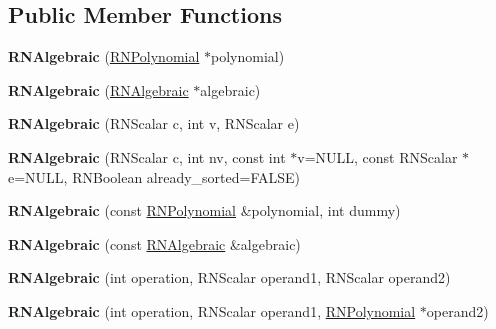 \subsection*{Public Member Functions}
\begin{DoxyCompactItemize}
\item 
{\bfseries R\+N\+Algebraic} (\hyperlink{class_r_n_polynomial}{R\+N\+Polynomial} $\ast$polynomial)\hypertarget{class_r_n_algebraic_a1919565e8b94da28541d0548bf1a71f7}{}\label{class_r_n_algebraic_a1919565e8b94da28541d0548bf1a71f7}

\item 
{\bfseries R\+N\+Algebraic} (\hyperlink{class_r_n_algebraic}{R\+N\+Algebraic} $\ast$algebraic)\hypertarget{class_r_n_algebraic_aaff9d9900e2fdcfd2a4d62b36a786694}{}\label{class_r_n_algebraic_aaff9d9900e2fdcfd2a4d62b36a786694}

\item 
{\bfseries R\+N\+Algebraic} (R\+N\+Scalar c, int v, R\+N\+Scalar e)\hypertarget{class_r_n_algebraic_ac13bdd4b4aaca2b71a9c617db43b6dd6}{}\label{class_r_n_algebraic_ac13bdd4b4aaca2b71a9c617db43b6dd6}

\item 
{\bfseries R\+N\+Algebraic} (R\+N\+Scalar c, int nv, const int $\ast$v=N\+U\+LL, const R\+N\+Scalar $\ast$e=N\+U\+LL, R\+N\+Boolean already\+\_\+sorted=F\+A\+L\+SE)\hypertarget{class_r_n_algebraic_a6454314e35fd2652797bd8dbdd5bf4be}{}\label{class_r_n_algebraic_a6454314e35fd2652797bd8dbdd5bf4be}

\item 
{\bfseries R\+N\+Algebraic} (const \hyperlink{class_r_n_polynomial}{R\+N\+Polynomial} \&polynomial, int dummy)\hypertarget{class_r_n_algebraic_acece09a338c5ffdf116cf8afcfeb3288}{}\label{class_r_n_algebraic_acece09a338c5ffdf116cf8afcfeb3288}

\item 
{\bfseries R\+N\+Algebraic} (const \hyperlink{class_r_n_algebraic}{R\+N\+Algebraic} \&algebraic)\hypertarget{class_r_n_algebraic_a33b004522b263ca2e769c8e74ef1b890}{}\label{class_r_n_algebraic_a33b004522b263ca2e769c8e74ef1b890}

\item 
{\bfseries R\+N\+Algebraic} (int operation, R\+N\+Scalar operand1, R\+N\+Scalar operand2)\hypertarget{class_r_n_algebraic_a3841e5b88ef20f0f4949577107793766}{}\label{class_r_n_algebraic_a3841e5b88ef20f0f4949577107793766}

\item 
{\bfseries R\+N\+Algebraic} (int operation, R\+N\+Scalar operand1, \hyperlink{class_r_n_polynomial}{R\+N\+Polynomial} $\ast$operand2)\hypertarget{class_r_n_algebraic_a49d1ce03ec5b3787f1e66ffc237d54ba}{}\label{class_r_n_algebraic_a49d1ce03ec5b3787f1e66ffc237d54ba}


\end{DoxyCompactItemize}
